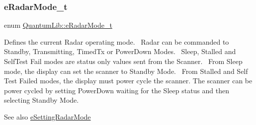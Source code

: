 \subsubsection{\texorpdfstring{e\+Radar\+Mode\+\_\+t}{eRadarMode\_t}}
{\footnotesize\ttfamily enum \mbox{\hyperlink{namespace_quantum_lib_ade0390db62ad71cd1a56b97245d00619}{Quantum\+Lib\+::e\+Radar\+Mode\+\_\+t}}}

Defines the current Radar operating mode.~\newline
Radar can be commanded to Standby, Transmitting, Timed\+Tx or Power\+Down Modes.~\newline
Sleep, Stalled and Self\+Test Fail modes are status only values sent from the Scanner.~\newline
From Sleep mode, the display can set the scanner to Standby Mode.~\newline
From Stalled and Self Test Failed modes, the display must power cycle the scanner. The scanner can be power cycled by setting Power\+Down waiting for the Sleep status and then selecting Standby Mode. \begin{DoxySeeAlso}{See also}
\mbox{\hyperlink{namespace_quantum_lib_acc8124e3e65bca4aa798d03a55e3d54ca979ebf5f13199739e12a44ae3a7d7596}{e\+Setting\+Radar\+Mode}} 
\end{DoxySeeAlso}
